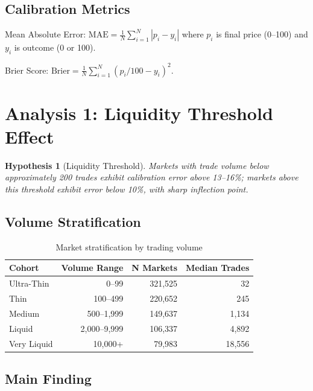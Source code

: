 \documentclass[a4paper,11pt]{article}
\theoremstyle{plain}
\newtheorem{hypothesis}[section]{Hypothesis}
\theoremstyle{definition}
\begin{document}
\subsection{Calibration Metrics}

Mean Absolute Error: $\text{MAE} = \frac{1}{N} \sum_{i=1}^{N} |p_i - y_i|$ where $p_i$ is final price (0--100) and $y_i$ is outcome (0 or 100).

Brier Score: $\text{Brier} = \frac{1}{N} \sum_{i=1}^{N} (p_i/100 - y_i)^2$.

\section{Analysis 1: Liquidity Threshold Effect}
\label{sec:analysis1}

\begin{hypothesis}[Liquidity Threshold]
Markets with trade volume below approximately 200 trades exhibit calibration error above 13--16\%; markets above this threshold exhibit error below 10\%, with sharp inflection point.
\end{hypothesis}

\subsection{Volume Stratification}

\begin{table}[h]
\centering
\small
\caption{Market stratification by trading volume}
\begin{tabular}{lrrr}
\toprule
Cohort & Volume Range & N Markets & Median Trades \\
\midrule
Ultra-Thin & 0--99 & 321,525 & 32 \\
Thin & 100--499 & 220,652 & 245 \\
Medium & 500--1,999 & 149,637 & 1,134 \\
Liquid & 2,000--9,999 & 106,337 & 4,892 \\
Very Liquid & 10,000+ & 79,983 & 18,556 \\
\bottomrule
\end{tabular}
\end{table}

\subsection{Main Finding}
\end{document}
